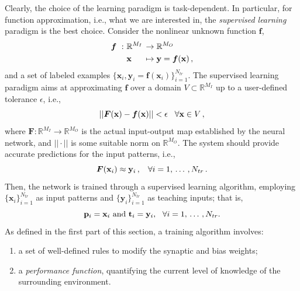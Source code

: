 \documentclass[12pt, a4paper, twoside, openright, notitlepage]{report}
\numberwithin{equation}{chapter}
\theoremstyle{theorem}
\theoremstyle{definition}
\theoremstyle{remark}
\theoremstyle{proposition}
\numberwithin{figure}{chapter}
\newcommand{\bg}[1]{\boldsymbol{#1}}
\begin{document}
		Clearly, the choice of the learning paradigm is task-dependent. In particular, for function approximation, i.e., what we are interested in, the \emph{supervised learning} paradigm is the best choice. Consider the nonlinear unknown function $\boldsymbol{f}$,
		\begin{equation*}
			\begin{aligned}
				\boldsymbol{f} ~ : ~ & \mathbb{R}^{M_I} \hspace*{-0.3cm} && \rightarrow \mathbb{R}^{M_O} \\
								   & \mathbf{x} && \mapsto \mathbf{y} = \boldsymbol{f}(\mathbf{x}) \, ,
			\end{aligned}
		\end{equation*}
		and a set of labeled examples $\big\lbrace \mathbf{x}_i, \mathbf{y}_i = \bg{f}(\mathbf{x}_i)\big\rbrace_{i = 1}^{N_{tr}}$. The supervised learning paradigm aims at approximating $\boldsymbol{f}$ over a domain $V \subset \mathbb{R}^{M_I}$ up to a user-defined tolerance $\epsilon$, i.e.,
		\begin{equation*}
			||\boldsymbol{F}(\mathbf{x}) - \boldsymbol{f}(\mathbf{x})|| < \epsilon \hspace*{0.3cm} \text{$\forall \mathbf{x} \in V$} \, ,
		\end{equation*}
		where $\mathbf{F} : \mathbb{R}^{M_I} \rightarrow \mathbb{R}^{M_O}$ is the actual input-output map established by the neural network, and $||\cdot||$ is some suitable norm on $\mathbb{R}^{M_O}$. The system should provide accurate predictions for the input patterns, i.e., 
		\begin{equation*}
			\boldsymbol{F}(\mathbf{x}_i) \approx \mathbf{y}_i \, , \hspace*{0.3cm} \text{$\forall i = 1, \, \ldots \, , N_{tr}$} \, .
		\end{equation*} 
		Then, the network is trained through a supervised learning algorithm, employing $\big\lbrace \mathbf{x}_i \big\rbrace_{i = 1}^{N_{tr}}$ as input patterns and $\big\lbrace \mathbf{y}_i \big\rbrace_{i = 1}^{N_{tr}}$ as teaching inputs; that is, 
		\begin{equation*}
			\text{$\mathbf{p}_i = \mathbf{x}_i$ and $\mathbf{t}_i = \mathbf{y}_i$,} \hspace*{0.3cm} \text{$\forall i = 1, \, \ldots \, , N_{tr}$.}
		\end{equation*}
		As defined in the first part of this section, a training algorithm involves:
		\begin{enumerate}[label=(\alph*)]
			\item a set of well-defined rules to modify the synaptic and bias weights;
			\label{a}
			\item a \emph{performance function}, quantifying the current level of knowledge of the surrounding environment.
			\label{b}
		\end{enumerate}
\end{document}
